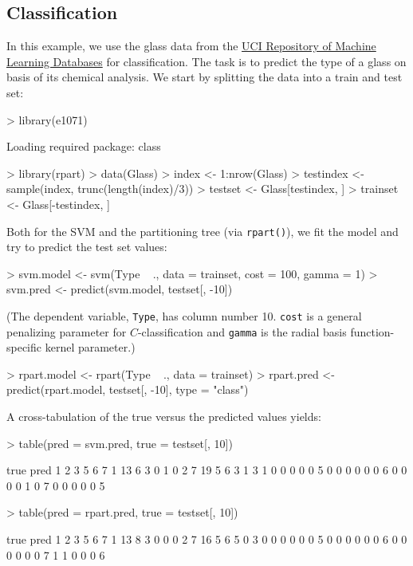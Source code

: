 \documentclass[a4paper]{article}
\begin{document}
\subsection*{Classification}

In this example, we use the glass data from the \href{http://www.ics.uci.edu/mlearn/MLRepository.html}{UCI Repository of
Machine Learning Databases} for
classification. The task is to predict the type of a glass on basis
of its chemical analysis.
We start by splitting the data into a train and test set:
\begin{Schunk}
\begin{Sinput}
> library(e1071)
\end{Sinput}
\begin{Soutput}
Loading required package: class 
\end{Soutput}
\begin{Sinput}
> library(rpart)
> data(Glass)
> index <- 1:nrow(Glass)
> testindex <- sample(index, trunc(length(index)/3))
> testset <- Glass[testindex, ]
> trainset <- Glass[-testindex, ]
\end{Sinput}
\end{Schunk}
Both for the SVM and the partitioning tree (via
\texttt{rpart()}), we fit the model and try to predict the test set
values:
\begin{Schunk}
\begin{Sinput}
> svm.model <- svm(Type ~ ., data = trainset, cost = 100, gamma = 1)
> svm.pred <- predict(svm.model, testset[, -10])
\end{Sinput}
\end{Schunk}
(The dependent variable, \texttt{Type}, has column number
10. \texttt{cost} is a general penalizing parameter for $C$-classification and
\texttt{gamma} is the radial basis function-specific kernel parameter.)
\begin{Schunk}
\begin{Sinput}
> rpart.model <- rpart(Type ~ ., data = trainset)
> rpart.pred <- predict(rpart.model, testset[, -10], type = "class")
\end{Sinput}
\end{Schunk}
A cross-tabulation of the true versus the predicted values yields:
\begin{Schunk}
\begin{Sinput}
> table(pred = svm.pred, true = testset[, 10])
\end{Sinput}
\begin{Soutput}
    true
pred  1  2  3  5  6  7
   1 13  6  3  0  1  0
   2  7 19  5  6  3  1
   3  1  0  0  0  0  0
   5  0  0  0  0  0  0
   6  0  0  0  0  1  0
   7  0  0  0  0  0  5
\end{Soutput}
\begin{Sinput}
> table(pred = rpart.pred, true = testset[, 10])
\end{Sinput}
\begin{Soutput}
    true
pred  1  2  3  5  6  7
   1 13  8  3  0  0  0
   2  7 16  5  6  5  0
   3  0  0  0  0  0  0
   5  0  0  0  0  0  0
   6  0  0  0  0  0  0
   7  1  1  0  0  0  6
\end{Soutput}
\end{Schunk}
\end{document}
